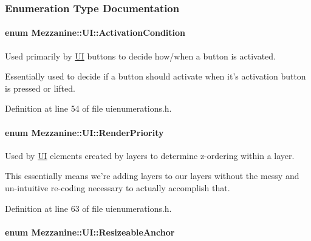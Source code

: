 \subsubsection{Enumeration Type Documentation}
\hypertarget{namespaceMezzanine_1_1UI_aca58497951b1b9c7da10f214da3392f0}{
\paragraph[{ActivationCondition}]{\setlength{\rightskip}{0pt plus 5cm}enum {\bf Mezzanine::UI::ActivationCondition}}\hfill}
\label{namespaceMezzanine_1_1UI_aca58497951b1b9c7da10f214da3392f0}


Used primarily by \hyperlink{namespaceMezzanine_1_1UI}{UI} buttons to decide how/when a button is activated. 

Essentially used to decide if a button should activate when it's activation button is pressed or lifted. 

Definition at line 54 of file uienumerations.h.

\hypertarget{namespaceMezzanine_1_1UI_ac4c753eb6b5d66350a243acc9ce54130}{
\paragraph[{RenderPriority}]{\setlength{\rightskip}{0pt plus 5cm}enum {\bf Mezzanine::UI::RenderPriority}}\hfill}
\label{namespaceMezzanine_1_1UI_ac4c753eb6b5d66350a243acc9ce54130}


Used by \hyperlink{namespaceMezzanine_1_1UI}{UI} elements created by layers to determine z-\/ordering within a layer. 

This essentially means we're adding layers to our layers without the messy and un-\/intuitive re-\/coding necessary to actually accomplish that. 

Definition at line 63 of file uienumerations.h.

\hypertarget{namespaceMezzanine_1_1UI_a1c571649db3aa98f4e16285b5b754928}{
\paragraph[{ResizeableAnchor}]{\setlength{\rightskip}{0pt plus 5cm}enum {\bf Mezzanine::UI::ResizeableAnchor}}\hfill}
\label{namespaceMezzanine_1_1UI_a1c571649db3aa98f4e16285b5b754928}


